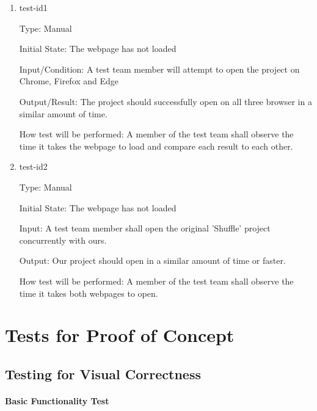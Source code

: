 \documentclass[12pt, titlepage]{article}
\begin{document}
\begin{enumerate}

\item{test-id1\\}

Type: Manual
					
Initial State: The webpage has not loaded
					
Input/Condition: A test team member will attempt to open the project on Chrome, Firefox and Edge
					
Output/Result: The project should successfully open on all three browser in a similar amount of time.
					
How test will be performed: \color{red}A member of the test team shall observe the time it takes the webpage to load and compare each result to each other. \color{black}
					
\item{test-id2\\}

Type: Manual
					
Initial State: The webpage has not loaded
					
Input: A test team member shall open the original 'Shuffle' project concurrently with ours.
					
Output: Our project should open in a similar amount of time or faster.
					
How test will be performed: \color{red}A member of the test team shall observe the time it takes both webpages to open. \color{black}

\end{enumerate}

\section{Tests for Proof of Concept}

\subsection{Testing for Visual Correctness}
		
\paragraph{Basic Functionality Test}
\end{document}
